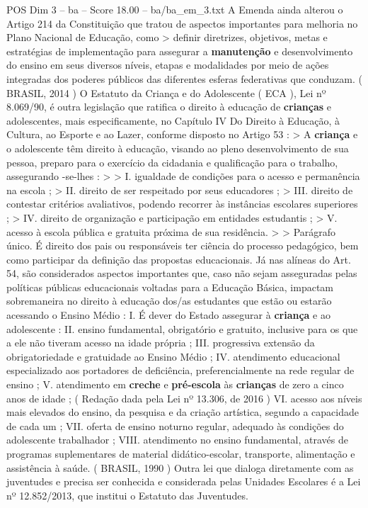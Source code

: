 \begin{textsample}{POS Dim 3 – ba – Score 18.00 – ba/ba\_em\_3.txt}
A Emenda ainda alterou o Artigo 214 da Constituição que tratou de aspectos importantes para melhoria no Plano Nacional de Educação, como > definir diretrizes, objetivos, metas e estratégias de implementação para assegurar a \textbf{manutenção} e desenvolvimento do ensino em seus diversos níveis, etapas e modalidades por meio de ações integradas dos poderes públicos das diferentes esferas federativas que conduzam. ( BRASIL, 2014 ) O Estatuto da Criança e do Adolescente ( ECA ), Lei nº 8.069/90, é outra legislação que ratifica o direito à educação de \textbf{crianças} e adolescentes, mais especificamente, no Capítulo IV Do Direito à Educação, à Cultura, ao Esporte e ao Lazer, conforme disposto no Artigo 53 : > A \textbf{criança} e o adolescente têm direito à educação, visando ao pleno desenvolvimento de sua pessoa, preparo para o exercício da cidadania e qualificação para o trabalho, assegurando -se-lhes : > > I. igualdade de condições para o acesso e permanência na escola ; > II. direito de ser respeitado por seus educadores ; > III. direito de contestar critérios avaliativos, podendo recorrer às instâncias escolares superiores ; > IV. direito de organização e participação em entidades estudantis ; > V. acesso à escola pública e gratuita próxima de sua residência. > > Parágrafo único.
É direito dos pais ou responsáveis ter ciência do processo pedagógico, bem como participar da definição das propostas educacionais.
Já nas alíneas do Art. 54, são considerados aspectos importantes que, caso não sejam asseguradas pelas políticas públicas educacionais voltadas para a Educação Básica, impactam sobremaneira no direito à educação dos/as estudantes que estão ou estarão acessando o Ensino Médio : I.
É dever do Estado assegurar à \textbf{criança} e ao adolescente : II. ensino fundamental, obrigatório e gratuito, inclusive para os que a ele não tiveram acesso na idade própria ; III. progressiva extensão da obrigatoriedade e gratuidade ao Ensino Médio ; IV. atendimento educacional especializado aos portadores de deficiência, preferencialmente na rede regular de ensino ; V. atendimento em \textbf{creche} e \textbf{pré-escola} às \textbf{crianças} de zero a cinco anos de idade ; ( Redação dada pela Lei nº 13.306, de 2016 ) VI. acesso aos níveis mais elevados do ensino, da pesquisa e da criação artística, segundo a capacidade de cada um ; VII. oferta de ensino noturno regular, adequado às condições do adolescente trabalhador ; VIII. atendimento no ensino fundamental, através de programas suplementares de material didático-escolar, transporte, alimentação e assistência à saúde. ( BRASIL, 1990 ) Outra lei que dialoga diretamente com as juventudes e precisa ser conhecida e considerada pelas Unidades Escolares é a Lei nº 12.852/2013, que institui o Estatuto das Juventudes.

\end{textsample}
